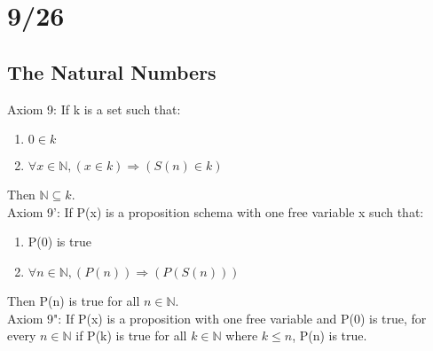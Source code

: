 \section{9/26}
\subsection{The Natural Numbers}
Axiom 9: If k is a set such that:
\begin{enumerate}
  \item $0 \in k$
  \item $\forall x \in \mathbb{N}, (x \in k) \Rightarrow (S(n) \in k)$
\end{enumerate}
Then $\mathbb{N} \subseteq k$.
\\
Axiom 9': If P(x) is a proposition schema with one free variable x such that: 
\begin{enumerate}
  \item P(0) is true
  \item $\forall n \in \mathbb{N}, (P(n)) \Rightarrow (P(S(n)))$ 
\end{enumerate}
Then P(n) is true for all $n \in \mathbb{N}$.
\\
Axiom 9": If P(x) is a proposition with one free variable and P(0) is true, for every $n \in \mathbb{N}$ if P(k) is true for all $k \in \mathbb{N}$ where $k \leq n$, P(n) is true.